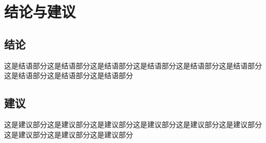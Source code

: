 \chapter*{结论与建议}
{}
\setcounter{section}{0}
\section{结论}
这是结语部分这是结语部分这是结语部分这是结语部分这是结语部分这是结语部分这是结语部分这是结语部分这是结语部分
\section{建议}
这是建议部分这是建议部分这是建议部分这是建议部分这是建议部分这是建议部分这是建议部分这是建议部分这是建议部分